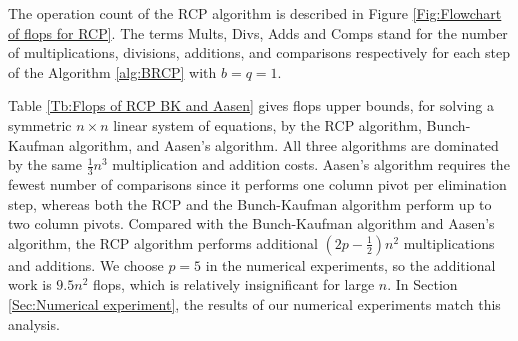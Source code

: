 \documentclass[11pt]{article}
\begin{document}
The operation count of the RCP algorithm is described in Figure \ref{Fig:Flowchart of flops for RCP}. The terms Mults, Divs, Adds and Comps stand for the number of multiplications, divisions, additions, and comparisons respectively for each step of the Algorithm \ref{alg:BRCP} with $b=q=1$. 

Table \ref{Tb:Flops of RCP BK and Aasen} gives flops upper bounds, for solving a symmetric $n\times n$ linear system of equations, by the RCP algorithm, Bunch-Kaufman algorithm, and Aasen's algorithm. All three algorithms are dominated by the same ${\displaystyle \frac{1}{3}n^3}$ multiplication and addition costs. Aasen's algorithm requires the fewest number of comparisons since it performs one column pivot per elimination step, whereas both the RCP and the Bunch-Kaufman algorithm perform up to two column pivots. Compared with the Bunch-Kaufman algorithm and Aasen's algorithm, the RCP algorithm performs additional $(2p-\frac{1}{2})n^2$ multiplications and additions. We choose $p = 5$ in the numerical experiments, so the additional work is $9.5 n^2$ flops, which is relatively insignificant for large $n$. In Section \ref{Sec:Numerical experiment}, the results of our numerical experiments match this analysis.
\end{document}
